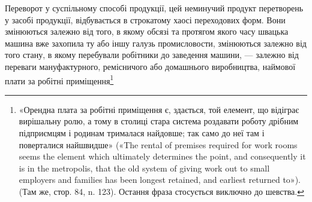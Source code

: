 Переворот у суспільному способі продукції, цей неминучий
продукт перетворень у засобі продукції, відбувається в строкатому
хаосі переходових форм. Вони змінюються залежно від того,
в якому обсязі та протягом якого часу швацька машина вже захопила
ту або іншу галузь промисловости, змінюються залежно
від того стану, в якому перебували робітники до заведення
машини, — залежно від переваги мануфактурного, ремісничого або
домашнього виробництва, наймової плати за робітні приміщення\footnote{
«Орендна плата за робітні приміщення є, здається, той елемент,
що відіграє вирішальну ролю, а тому в столиці стара система роздавати
роботу дрібним підприємцям і родинам трималася найдовше; так само
до неї там і поверталися найшвидше» («The rental of premises required
for work rooms seems the element which ultimately determines the point,
and consequently it is in the metropolis, that the old system of giving work
out to small employers and families has been longest retained, and earliest
returned to»). (Там же, стор. 84, n. 123). Остання фраза стосується виключно
до шевства.
}
\parbreak{}  %
